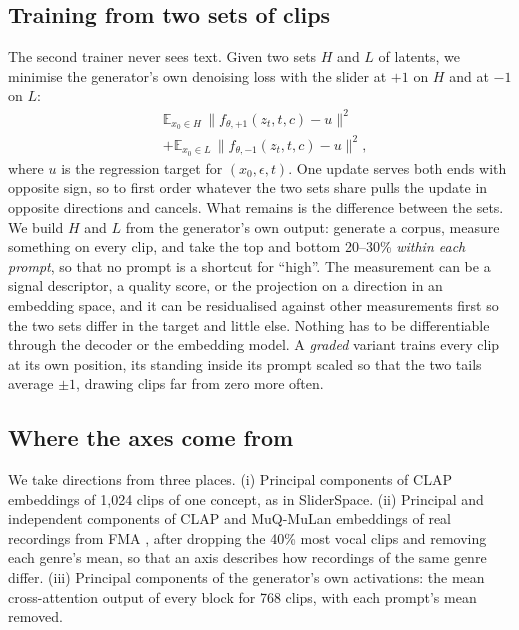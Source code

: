 \subsection{Training from two sets of clips}

The second trainer never sees text. Given two sets $H$ and $L$ of latents, we minimise the generator's own denoising loss with the slider at $+1$ on $H$ and at $-1$ on $L$:
\begin{equation}
\begin{split}
  &\mathbb{E}_{x_0\in H}\,\bigl\|f_{\theta,+1}(z_t,t,c)-u\bigr\|^2 \\ &+ \mathbb{E}_{x_0\in L}\,\bigl\|f_{\theta,-1}(z_t,t,c)-u\bigr\|^2 ,
\end{split}
\end{equation}
where $u$ is the regression target for $(x_0,\epsilon,t)$. One update serves both ends with opposite sign, so to first order whatever the two sets share pulls the update in opposite directions and cancels. What remains is the difference between the sets. We build $H$ and $L$ from the generator's own output: generate a corpus, measure something on every clip, and take the top and bottom 20--30\% \emph{within each prompt}, so that no prompt is a shortcut for ``high''. The measurement can be a signal descriptor, a quality score, or the projection on a direction in an embedding space, and it can be residualised against other measurements first so the two sets differ in the target and little else. Nothing has to be differentiable through the decoder or the embedding model. A \emph{graded} variant trains every clip at its own position, its standing inside its prompt scaled so that the two tails average $\pm1$, drawing clips far from zero more often.

\subsection{Where the axes come from}

We take directions from three places. (i) Principal components of CLAP embeddings of 1{,}024 clips of one concept, as in SliderSpace. (ii) Principal and independent components \citep{yamagiwa2023ica} of CLAP \citep{wu2023clap} and MuQ-MuLan \citep{zhu2025muq} embeddings of \covReal{} real recordings from FMA \citep{defferrard2017fma}, after dropping the 40\% most vocal clips and removing each genre's mean, so that an axis describes how recordings of the same genre differ. (iii) Principal components of the generator's own activations: the mean cross-attention output of every block for 768 clips, with each prompt's mean removed.

